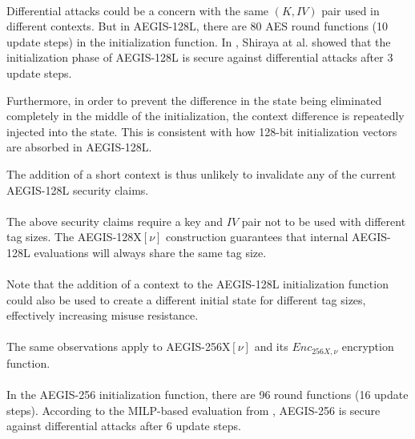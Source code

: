 \documentclass[envcountsame,runningheads,notitlepage]{llncs}
\begin{document}
\paragraph{}

Differential attacks could be a concern with the same $(K, IV)$ pair used in different contexts.
But in AEGIS-128L, there are 80 AES round functions (10 update steps) in the initialization function. In \cite{STSI23}, Shiraya at al. showed that the initialization phase of AEGIS-128L is secure against differential attacks after 3 update steps.

Furthermore, in order to prevent the difference in the state being eliminated completely in the middle of the initialization, the context difference is repeatedly injected into the state. This is consistent with how 128-bit initialization vectors are absorbed in AEGIS-128L.

The addition of a short context is thus unlikely to invalidate any of the current AEGIS-128L security claims.

\paragraph{}

The above security claims require a key and $IV$ pair not to be used with different tag sizes. The AEGIS-128X$[\nu]$ construction guarantees that internal AEGIS-128L evaluations will always share the same tag size.

\paragraph{}

Note that the addition of a context to the AEGIS-128L initialization function could also be used to create a different initial state for different tag sizes, effectively increasing misuse resistance.

\paragraph{}

The same observations apply to AEGIS-256X$[\nu]$ and its $Enc_{256X,\nu}$ encryption function.

\paragraph{}

In the AEGIS-256 initialization function, there are 96 round functions (16 update steps). According to the MILP-based evaluation from \cite{STSI23}, AEGIS-256 is secure against differential attacks after 6 update steps.
\end{document}
